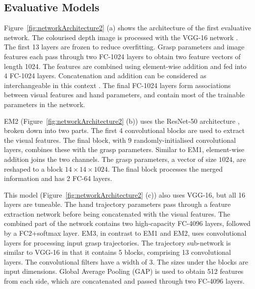 \subsection{Evaluative Models}

\noindent
Figure~\ref{fig:networkArchitecture2} (a) shows the architecture of the first evaluative network. The colourised depth image is processed with the VGG-16 network \cite{Simonyan14c}. The first 13 layers are frozen to reduce overfitting. Grasp parameters and image features each pass through two FC-1024 layers to obtain two feature vectors of length 1024. The features are combined using element-wise addition and fed into 4 FC-1024 layers. Concatenation and addition can be considered as interchangeable in this context \cite{dumoulin2018feature-wise}. The final FC-1024 layers form associations between visual features and hand parameters, and contain most of the trainable parameters in the network.

\noindent
EM2 (Figure~\ref{fig:networkArchitecture2} (b)) uses the ResNet-50 architecture \cite{HeZRS15}, broken down into two parts. The first 4 convolutional blocks are used to extract the visual features. The final block, with 9 randomly-initialised convolutional layers, combines these with the grasp parameters. Similar to EM1, element-wise addition joins the two channels. The grasp parameters, a vector of size $1024$, are reshaped to a block $14 \times 14 \times 1024$. The final block processes the merged information and has 2 FC-64 layers.

\noindent
This model (Figure~\ref{fig:networkArchitecture2} (c)) also uses VGG-16, but all 16 layers are tuneable. The hand trajectory parameters pass through a feature extraction network before being concatenated with the visual features. The combined part of the network contains two high-capacity FC-4096 layers, followed by a FC2+softmax layer. EM3, in contrast to EM1 and EM2, uses convolutional layers for processing input grasp trajectories. The trajectory sub-network is similar to VGG-16 in that it contains 5 blocks, comprising 13 convolutional layers. The convolutional filters have a width of 3. The sizes under the blocks are input dimensions. Global Average Pooling (GAP) is used to obtain 512 features from each side, which are concatenated and passed through two FC-4096 layers. 

